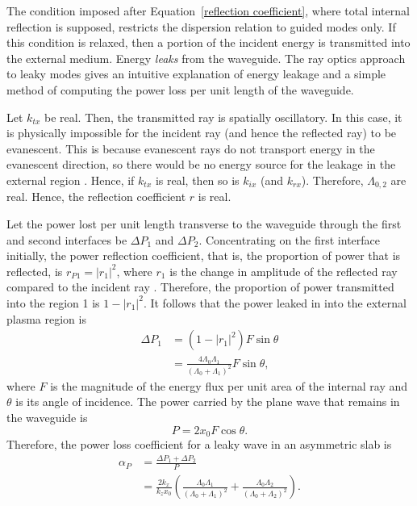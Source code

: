 	The condition imposed after Equation~\eqref{reflection coefficient}, where total internal reflection is supposed, restricts the dispersion relation to guided modes only. If this condition is relaxed, then a portion of the incident energy is transmitted into the external medium. Energy \textit{leaks} from the waveguide. The ray optics approach to leaky modes gives an intuitive explanation of energy leakage and a simple method of computing the power loss per unit length of the waveguide.
	
	Let $k_{tx}$ be real. Then, the transmitted ray is spatially oscillatory. In this case, it is physically impossible for the incident ray (and hence the reflected ray) to be evanescent. This is because evanescent rays do not transport energy in the evanescent direction, so there would be no energy source for the leakage in the external region \citep{goe_etal04}. Hence, if $k_{tx}$ is real, then so is $k_{ix}$ (and $k_{rx}$). Therefore, $\Lambda_{0, 2}$ are real. Hence, the reflection coefficient $r$ is real.
	
	Let the power lost per unit length transverse to the waveguide through the first and second interfaces be $\Delta P_1$ and $\Delta P_2$. Concentrating on the first interface initially, the power reflection coefficient, that is, the proportion of power that is reflected, is $r_{P1} = |r_1|^2$, where $r_1$ is the change in amplitude of the reflected ray compared to the incident ray \citep{mar74}. Therefore, the proportion of power transmitted into the region 1 is $1 - |r_1|^2$. It follows that the power leaked in into the external plasma region is
	\begin{align}
	\Delta P_1 &= (1 - |r_1|^2)F\sin{\theta} \\
	&= \frac{4\Lambda_0\Lambda_1}{(\Lambda_0 + \Lambda_1)^2}F\sin{\theta},
	\end{align}
	where $F$ is the magnitude of the energy flux per unit area of the internal ray and $\theta$ is its angle of incidence. The power carried by the plane wave that remains in the waveguide is
	\begin{equation}
	P = 2x_0F\cos{\theta}.
	\end{equation}
	Therefore, the power loss coefficient for a leaky wave in an asymmetric slab is
	\begin{align}
	\alpha_P &= \frac{\Delta P_1 + \Delta P_2}{P} \\
	&= \frac{2k_x}{k_zx_0}\left( \frac{\Lambda_0\Lambda_1}{(\Lambda_0 + \Lambda_1)^2} + \frac{\Lambda_0\Lambda_2}{(\Lambda_0 + \Lambda_2)^2} \right).
	\end{align}
	
